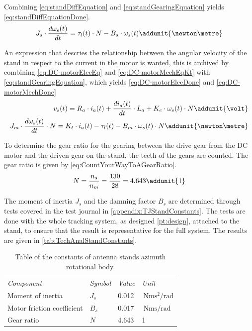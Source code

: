 Combining \autoref{eq:standDiffEquation} and \autoref{eq:standGearingEquation} yields \autoref{eq:standDiffEquationDone}.
\begin{equation} \label{eq:standDiffEquationDone}
J_s \cdot \frac{d \omega_{s}(t)}{d t} =\tau_l(t) \cdot N - B_s \cdot \omega_{s}(t) \addunit{\newton\metre}
\end{equation}

An expression that descries the relationship between the angular velocity of the stand in respect to the current in the motor is wanted, this is archived by combining \autoref{eq:DC-motorElecEq} and \autoref{eq:DC-motorMechEqKt} with \autoref{eq:standGearingEquation}, which yields \autoref{eq:DC-motorElecDone} and \autoref{eq:DC-motorMechDone}
\begin{subequations}
	\begin{align}
	v_{s}(t) = R_{a}\cdot i_a(t) + \frac{d i_a(t)}{d t}\cdot L_a + K_{e}\cdot\omega_{s}(t)\cdot N \addunit{\volt} \label{eq:DC-motorElecDone}\\ 
	J_m \cdot \frac{d \omega_{s}(t)}{d t}\cdot N = K_t\cdot i_a(t)- \tau_l(t) - B_m \cdot \omega_{s}(t)\cdot N \addunit{\newton\metre} \label{eq:DC-motorMechDone}
	\end{align}
\end{subequations}

To determine the gear ratio for the gearing between the drive gear from the DC motor and the driven gear on the stand, the teeth of the gears are counted. The gear ratio is given by \autoref{eq:CountYourWayToAGearRatio}. 
\begin{equation} \label{eq:CountYourWayToAGearRatio}
N = \frac{n_s}{n_m} = \frac{130}{28} = 4.643 \addunit{1}
\end{equation}
\startexplain
{}
\stopexplain

The moment of inertia $J_s$ and the damning factor $B_s$ are determined through tests covered in the test journal in \autoref{appendix:TJStandConstants}. The tests are done with the whole tracking system, as designed \autoref{pt:design}, attached to the stand, to ensure that the result is representative for the full system. The results are given in \autoref{tab:TechAnalStandConstants}. 
\begin{table}[h!]
	\centering
	\caption{Table of the constants of antenna stands azimuth rotational body.}\label{tab:TechAnalStandConstants}
	\begin{tabular}{l l l l}
		\textit{Component}		&	\textit{Symbol} &  	\textit{Value} &  \textit{Unit} \\ \rowcolor{lightGrey} \toprule
		Moment of inertia					&	$J_s$	& 0.012 			   & $\SI{}{\newton\metre\second\squared\per\radian}$ \\
		Motor friction coefficient					&	$B_s$	& 0.017 			   & $\SI{}{\newton\metre\second\per\radian}$ \\ \rowcolor{lightGrey}
		Gear ratio					&	$N$	& 4.643 			   & 1
	\end{tabular}	
\end{table}

